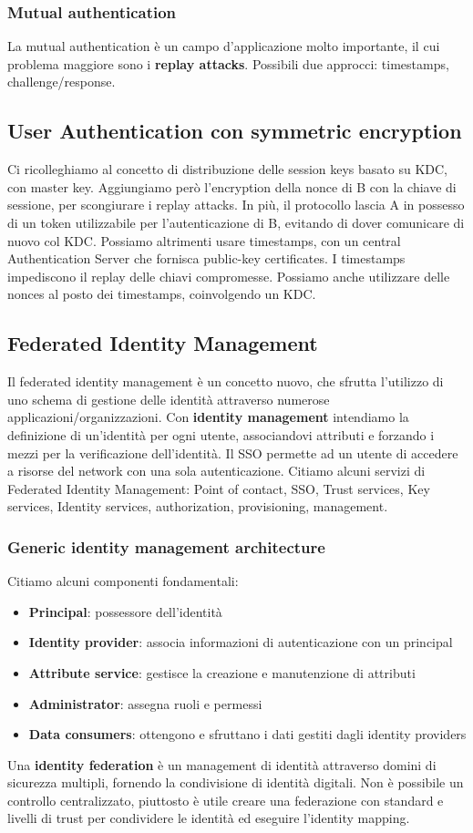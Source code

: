 \documentclass[11pt]{article}
\begin{document}
\subsubsection{Mutual authentication}
La mutual authentication è un campo d'applicazione molto importante, il cui problema maggiore sono i \textbf{replay attacks}. Possibili due approcci: timestamps, challenge/response.
\subsection{User Authentication con symmetric encryption}
Ci ricolleghiamo al concetto di distribuzione delle session keys basato su KDC, con master key. Aggiungiamo però l'encryption della nonce di B con la chiave di sessione, per scongiurare i replay attacks. In più, il protocollo lascia A in possesso di un token utilizzabile per l'autenticazione di B, evitando di dover comunicare di nuovo col KDC. Possiamo altrimenti usare timestamps, con un central Authentication Server che fornisca public-key certificates. I timestamps impediscono il replay delle chiavi compromesse. Possiamo anche utilizzare delle nonces al posto dei timestamps, coinvolgendo un KDC. 
\subsection{Federated Identity Management}
Il federated identity management è un concetto nuovo, che sfrutta l'utilizzo di uno schema di gestione delle identità attraverso numerose applicazioni/organizzazioni. Con \textbf{identity management} intendiamo la definizione di un'identità per ogni utente, associandovi attributi e forzando i mezzi per la verificazione dell'identità. Il SSO permette ad un utente di accedere a risorse del network con una sola autenticazione. Citiamo alcuni servizi di Federated Identity Management: Point of contact, SSO, Trust services, Key services, Identity services, authorization, provisioning, management. 
\subsubsection{Generic identity management architecture}
Citiamo alcuni componenti fondamentali:
\begin{itemize}
    \item \textbf{Principal}: possessore dell'identità
    \item \textbf{Identity provider}: associa informazioni di autenticazione con un principal
    \item \textbf{Attribute service}: gestisce la creazione e manutenzione di attributi 
    \item \textbf{Administrator}: assegna ruoli e permessi
    \item \textbf{Data consumers}: ottengono e sfruttano i dati gestiti dagli identity providers
\end{itemize}
Una \textbf{identity federation} è un management di identità attraverso domini di sicurezza multipli, fornendo la condivisione di identità digitali. Non è possibile un controllo centralizzato, piuttosto è utile creare una federazione con standard e livelli di trust per condividere le identità ed eseguire l'identity mapping. 
\end{document}
